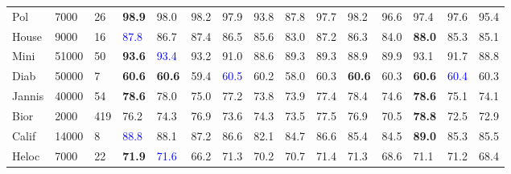 \documentclass{article} %
\renewcommand{\>}{{\rightarrow}}
\renewcommand{\=}{\stackrel{\triangle}{=}}
\newcommand{\0}{{\mathbf 0}}
\begin{document}
\begin{table}[t]
\begin{center}
\begin{tabular}{|p{0.63cm}|p{0.75cm}|p{0.43cm}|p{0.42cm}|p{0.55cm}|p{0.4cm}|p{0.5cm}|p{0.4cm}|p{0.4cm}|p{0.4cm}|p{0.4cm}|p{0.4cm}|p{0.4cm}|p{0.4cm}|p{0.40cm}|}
Pol    &7000 &26   &\textbf{98.9} &98.0 &98.2 &97.9 &93.8 &87.8 &97.7 &98.2 &96.6 &97.4 &97.6 &95.4\\
House     &9000 &16   &\textcolor{blue}{87.8} &86.7 &87.4 &86.5 &85.6 &83.0 &87.2 &86.3  &84.0 &\textbf{88.0} &85.3 &85.1\\
Mini    &51000 &50   &\textbf{93.6} &\textcolor{blue}{93.4} &93.2 &91.0 &88.6 &89.3 &89.3 &88.9  &89.9 &93.1 &91.7 &88.8\\
Diab    &50000 &7     &\textbf{60.6} &\textbf{60.6} &59.4 &\textcolor{blue}{60.5} &60.2 &58.0 &60.3 &\textbf{60.6}  &60.3 &\textbf{60.6} &\textcolor{blue}{60.4} &60.3\\
Jannis    &40000 &54   &\textbf{78.6} &78.0 &75.0 &77.2 &73.8 &73.9 &77.4 &78.4 &74.6 &\textbf{78.6}  &75.1 &74.1\\
Bior   &2000 &419    &76.2 &74.3 &76.9 &73.6 &74.3 &73.5 &77.5 &76.9  &70.5 &\textbf{78.8}  &72.5 &72.9\\
Calif   &14000 &8     &\textcolor{blue}{88.8} &88.1 &87.2 &86.6 &82.1 &84.7 &86.6 &85.4  &84.5 &\textbf{89.0} &85.3 &85.5\\
Heloc    &7000 &22  &\textbf{71.9} &\textcolor{blue}{71.6} &66.2 &71.3 &70.2 &70.7 &71.4 &71.3 &68.6  &71.1 &71.2 &68.4\\
\hline 
\end{tabular}
\end{center}
\end{table}
\end{document}
